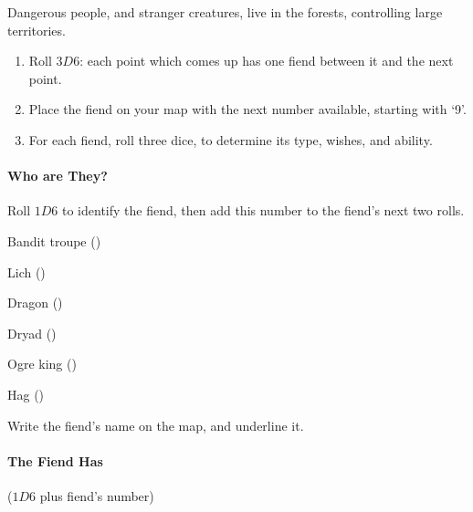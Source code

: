 \begin{multicols}{2}
\label{mapFiends}

Dangerous people, and stranger creatures, live in the forests, controlling large territories.

\begin{enumerate}
\item
  Roll $3D6$: each point which comes up has one fiend between it and the
  next point.
\item
  Place the fiend on your map with the next number available, starting with `9'.
\item
  For each fiend, roll three dice, to determine its type, wishes, and
  ability.
\end{enumerate}

\paragraph{Who are They?}
\label{fiendTypes}

Roll $1D6$ to identify the fiend, then add this number to the fiend's next two rolls.

\begin{multicols}{2}
\begin{dlist}
\item
  Bandit troupe ()
\item
  Lich ()
\item
  Dragon ()
\item
  Dryad ()
\item
  Ogre king ()
\item
  Hag ()
\end{dlist}
\end{multicols}

Write the fiend's name on the map, and underline it.

\paragraph{The Fiend Has}

($1D6$ plus fiend's number)


\end{multicols}
